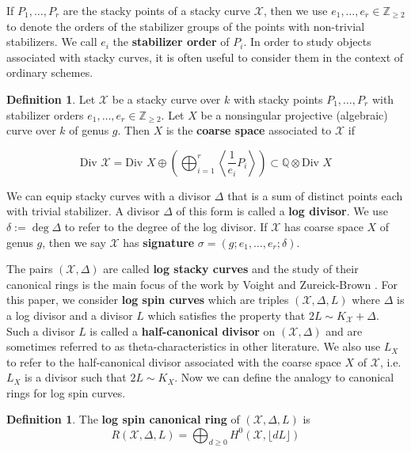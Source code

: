 \documentclass{amsart}
\theoremstyle{plain}
\theoremstyle{definition}
\newtheorem{defn}[thm]{Definition}
\theoremstyle{remark}
\numberwithin{equation}{section}
\newcommand\BQ{{\mathbb Q}}
\newcommand\BZ{{\mathbb Z}}
\newcommand \sx{\mathscr X}
\newcommand \di{\text{Div }}
\newcommand \halfcan{L}
\begin{document}
If $P_1, \ldots, P_r$ are the stacky points of a stacky curve $\sx$,
then we use $e_1,\ldots, e_r \in \BZ_{\geq 2}$ to denote the orders
of the stabilizer groups of the points with non-trivial
stabilizers. We call $e_i$ the \textbf{stabilizer order} of $P_i$.
In order to study objects associated with stacky curves, it is often
useful to consider them in the context of ordinary schemes. 

\begin{defn}
Let $\sx$ be a stacky curve over $k$ with stacky points $P_1, \ldots,
P_r$ with stabilizer orders $e_1,\ldots, e_r \in \BZ_{\geq 2}$.
Let $X$ be a nonsingular projective (algebraic) curve over $k$ of
genus $g$. Then $X$ is the \textbf{coarse space} associated to $\sx$
if

\[
	\di \sx = \di X \oplus \left(\bigoplus_{i
	= 1}^r \left\langle \frac{1}{e_i}P_i \right\rangle \right) \subset \BQ \otimes \di X
\]
\end{defn}

We can equip stacky curves with a divisor $\Delta$ that is a 
sum of distinct points each with trivial stabilizer. A divisor
$\Delta$ of this form is called a \textbf{log divisor}. We use
$\delta := \deg \Delta$ to refer to the degree of the log divisor.
If $\sx$ has coarse space $X$ of genus $g$, then we say $\sx$ has
\textbf{signature} $\sigma = (g; e_1, \ldots, e_r; \delta)$.

The pairs $(\sx, \Delta)$ are called \textbf{log stacky curves}
and the study of their canonical rings is the main focus of
the work by Voight and Zureick-Brown \cite{vzb:stacky}.
For this paper, we consider \textbf{log spin curves} which are
triples $(\sx, \Delta, \halfcan)$ where $\Delta$ is a log divisor
and a divisor $\halfcan$ which satisfies the property that
$2\halfcan \sim K_\sx + \Delta$. Such a divisor $\halfcan$
is called a \textbf{half-canonical divisor} on $(\sx, \Delta)$
and are sometimes referred to as theta-characteristics in other
literature. We also use $\halfcan_X$ to refer to the half-canonical
divisor associated with the coarse space $X$ of $\sx$, i.e.
$\halfcan_X$ is a divisor such that $2\halfcan \sim K_X$.
Now we can define the analogy to canonical rings for
log spin curves.

\begin{defn}
The {\bf log spin canonical ring} of $(\sx, \Delta, \halfcan)$ is
\[
	R(\sx, \Delta, L) = \bigoplus_{d \geq 0} H^0(\sx, \lfloor d L \rfloor)
\]
\end{defn}
\end{document}
